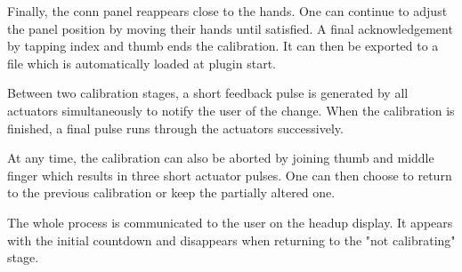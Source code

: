 \documentclass[hyperref, bachelorofscience]{cgvpub}
\begin{document}
Finally, the conn panel reappears close to the hands. One can continue to adjust the panel position by moving their hands until satisfied. A final acknowledgement by tapping index and thumb ends the calibration. It can then be exported to a file which is automatically loaded at plugin start.

Between two calibration stages, a short feedback pulse is generated by all actuators simultaneously to notify the user of the change. When the calibration is finished, a final pulse runs through the actuators successively. 

At any time, the calibration can also be aborted by joining thumb and middle finger which results in three short actuator pulses. One can then choose to return to the previous calibration or keep the partially altered one.

The whole process is communicated to the user on the headup display. It appears with the initial countdown and disappears when returning to the "not calibrating" stage.
\end{document}
